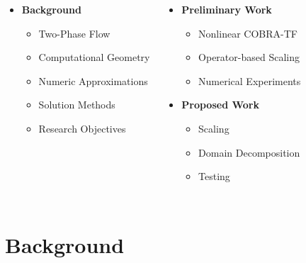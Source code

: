 \documentclass[compress,xcolor=table]{beamer}
\begin{document}
\begin{frame}

\begin{columns}
\begin{itemize}
\item{\textbf{Background}
\begin{itemize}
\item{Two-Phase Flow}
\item{Computational Geometry}
\item{Numeric Approximations}
\item{Solution Methods}
\item{Research Objectives}
\end{itemize}
}
\end{itemize}

\begin{itemize}
\item{\textbf{Preliminary Work}
\begin{itemize}
\item{Nonlinear COBRA-TF}
\item{Operator-based Scaling}
\item{Numerical Experiments}
\end{itemize}
}
\item{\textbf{Proposed Work}
\begin{itemize}
\item{Scaling}
\item{Domain Decomposition}
\item{Testing}
\end{itemize}
}
\end{itemize}

\end{columns}
\end{frame}
\section[Background]{Background}
\end{document}
